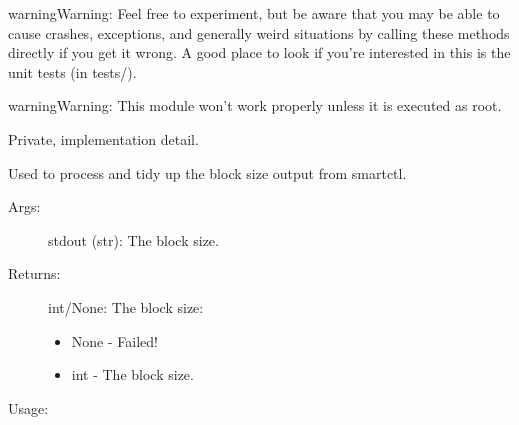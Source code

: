 \documentclass[letterpaper,10pt,english]{sphinxmanual}
\begin{document}
\begin{sphinxadmonition}{warning}{Warning:}
Feel free to experiment, but be aware that you may be able to
cause crashes, exceptions, and generally weird situations by calling
these methods directly if you get it wrong. A good place to
look if you’re interested in this is the unit tests (in tests/).
\end{sphinxadmonition}

\begin{sphinxadmonition}{warning}{Warning:}
This module won’t work properly unless it is executed as root.
\end{sphinxadmonition}

\begin{fulllineitems}
\label{\detokenize{cygwin:getdevinfo.cygwin.compute_block_size}}
Private, implementation detail.

Used to process and tidy up the block size output from smartctl.
\begin{description}
\item[{Args:}] \leavevmode
stdout (str):       The block size.

\item[{Returns:}] \leavevmode
int/None: The block size:
\begin{itemize}
\item {} 
None - Failed!

\item {} 
int  - The block size.

\end{itemize}

\end{description}

Usage:

\begin{sphinxVerbatim}[commandchars=\\\{\}]
\end{sphinxVerbatim}

\end{fulllineitems}

\end{document}

